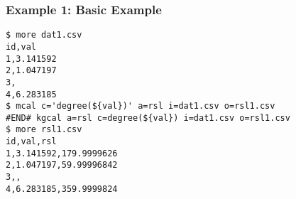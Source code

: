 \subsubsection*{Example 1: Basic Example}



\begin{Verbatim}[baselinestretch=0.7,frame=single]
$ more dat1.csv
id,val
1,3.141592
2,1.047197
3,
4,6.283185
$ mcal c='degree(${val})' a=rsl i=dat1.csv o=rsl1.csv
#END# kgcal a=rsl c=degree(${val}) i=dat1.csv o=rsl1.csv
$ more rsl1.csv
id,val,rsl
1,3.141592,179.9999626
2,1.047197,59.99996842
3,,
4,6.283185,359.9999824
\end{Verbatim}
